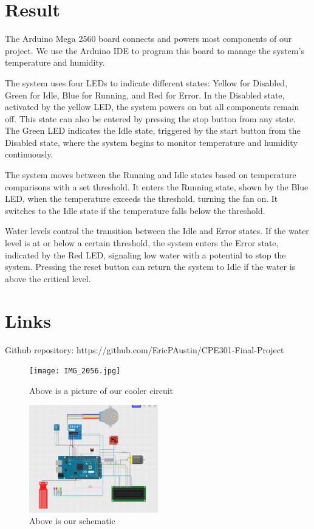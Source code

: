 \documentclass{article}
\begin{document}
\section{Result}
The Arduino Mega 2560 board connects and powers most components of our project. We use the Arduino IDE to program this board to manage the system’s temperature and humidity.

The system uses four LEDs to indicate different states: Yellow for Disabled, Green for Idle, Blue for Running, and Red for Error. In the Disabled state, activated by the yellow LED, the system powers on but all components remain off. This state can also be entered by pressing the stop button from any state. The Green LED indicates the Idle state, triggered by the start button from the Disabled state, where the system begins to monitor temperature and humidity continuously.

The system moves between the Running and Idle states based on temperature comparisons with a set threshold. It enters the Running state, shown by the Blue LED, when the temperature exceeds the threshold, turning the fan on. It switches to the Idle state if the temperature falls below the threshold.

Water levels control the transition between the Idle and Error states. If the water level is at or below a certain threshold, the system enters the Error state, indicated by the Red LED, signaling low water with a potential to stop the system. Pressing the reset button can return the system to Idle if the water is above the critical level.


\section{Links}
Github repository: https://github.com/EricPAustin/CPE301-Final-Project


\begin{figure}
\centering
\texttt{[image: IMG\_2056.jpg]}
\caption{\label{fig:img1}Above is a picture of our cooler circuit}
\end{figure}

\begin{figure}
\centering
\includegraphics[width=0.5\textwidth]{image.png}
\caption{\label{fig:img2}Above is our schematic}
\end{figure}
    
\end{document}
